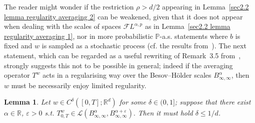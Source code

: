 \documentclass[10pt]{article}
\newtheorem{lemma}[theorem]{Lemma}
\begin{document}
The reader might wonder if the restriction $\rho > d / 2$ appearing in
Lemma~\ref{sec2.2 lemma regularity averaging 2} can be weakened, given that it
does not appear when dealing with the scales of spaces $\mathcal{F} L^{\alpha,
p}$ as in Lemma~\ref{sec2.2 lemma regularity averaging 1}, nor in more
probabilistic $\mathbb{P}$-a.s. statements where $b$ is fixed and $w$ is
sampled as a stochastic process (cf. the results
from~{\cite{catelliergubinelli,galeatigubinelli_ode}}). The next statement,
which can be regarded as a useful rewriting of Remark~3.5
from~{\cite{perkowski}}, strongly suggests this not to be possible in general;
indeed if the averaging operator $T^w$ acts in a regularising way over the
Besov--H\"{o}lder scales $B^{\alpha}_{\infty, \infty}$, then $w$ must be
necessarily enjoy limited regularity.

\begin{lemma}
  \label{lem:perkowski}Let $w \in C^{\delta} ([0, T] ; \mathbb{R}^d)$ for some $\delta\in (0,1]$; suppose
  that there exist $\alpha \in \mathbb{R}$, $\varepsilon > 0$ s.t. $T^w_{0, T}
  \in \mathcal{L} (B^{\alpha}_{\infty, \infty}, B^{\alpha +
  \varepsilon}_{\infty, \infty}) .$ Then it must hold $\delta \leqslant 1 /
  d$.
\end{lemma}
\end{document}
